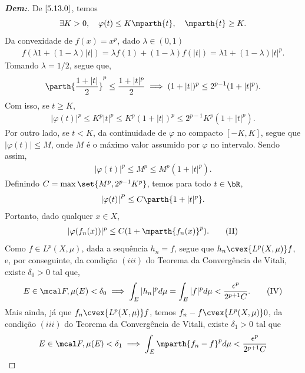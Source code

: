 \begin{proof}[\textbf{Dem:}]
  De $\eqref{5.13.0}$, temos 
  \begin{align*}
    \exists K>0, \quad
    \varphi(t) \le K\mparth{t},\quad \mparth{t}\ge K.
  \end{align*}
  Da convexidade de $f(x) = x^p$, dado $\lambda \in (0, 1)$
  \begin{align*}
    f(\lambda 1+ (1 - \lambda)|t|) = \lambda f(1) + (1-\lambda)f(|t|) 
    = \lambda 1 + (1-\lambda)|t|^p.
  \end{align*}
  Tomando $\lambda = 1/2$, segue que, 
  \begin{align*}
    \parth{\frac{1 + |t|}{2}}^p \le \frac{1+|t|^p}{2} \implies (1+|t|)^p \le 2^{p-1}(1+|t|^p). 
  \end{align*}
  Com isso, se $t \ge K$,
  \begin{align*}
    |\varphi(t)|^p \le K^p|t|^p \le K^p(1 + |t|)^p \le 2^{p-1}K^p (1 + |t|^p).
  \end{align*}
  Por outro lado, se $t < K$, da continuidade de $\varphi$ no compacto  $[-K, K]$,
  segue que $|\varphi(t)| \le M$, onde $M$ é o máximo valor assumido por $\varphi$
  no intervalo. Sendo assim,  
  \begin{align*}
    |\varphi(t)|^p \le M^p \le M^p (1 + |t|^p). 
  \end{align*}
  Definindo $C = \max\set{M^p, 2^{p-1}K^p}$, temos para todo $t \in \bR$,
  \begin{align*}
    |\varphi(t)|^P \le C \parth{1 + |t|^p}.
  \end{align*}
  Portanto, dado qualquer $x \in X$,
  \begin{align*}
    |\varphi(f_n(x))|^p \le C(1 + \mparth{f_n(x)}^p).
    \tag{II}
    \label{eq:5.14.2}
  \end{align*}
  Como $f\in L^p(X, \mu)$, dada a sequência $h_n = f$, segue que 
  $h_n \cvex {L^p(X, \mu)} f$, e, por conseguinte, da condição 
  $(iii)$ do Teorema da Convergência de Vitali, existe $\delta_0>0$ tal que, 
  \begin{align*}
    E \in \mcal F, \mu(E)< \delta_0 
    \implies \int_{E} |h_n|^p d\mu = \int_{E} |f|^p d\mu < \frac{\epsilon^p}{2^{p+1}C}.
    \tag{IV}
    \label{eq:5.14.4}
  \end{align*}
  Mais ainda, já que $f_n \cvex {L^p(X, \mu)} f$, temos $f_n - f \cvex{L^p(X, \mu)} 0$,
  da condição $(iii)$ do Teorema da Convergência de Vitali,
  existe $\delta_1>0$ tal que
  \begin{align*}
    E \in \mcal F,\mu(E) < \delta_1 \implies 
    \int_{E} \mparth{f_n - f}^p d\mu < \frac{\epsilon^p}{2^{p+1}C}

\end{align*}
\end{proof}
